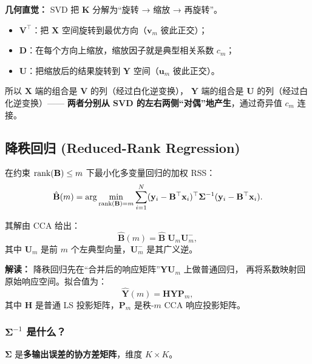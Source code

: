 \medskip
\noindent
\textbf{几何直觉：} SVD 把 $\mathbf{K}$ 分解为``旋转 → 缩放 → 再旋转''。
\begin{itemize}
    \item $\mathbf{V}^\top$：把 $\mathbf{X}$ 空间旋转到最优方向（$\mathbf{v}_m$ 彼此正交）；
    \item $\mathbf{D}$：在每个方向上缩放，缩放因子就是典型相关系数 $c_m$；
    \item $\mathbf{U}$：把缩放后的结果旋转到 $\mathbf{Y}$ 空间（$\mathbf{u}_m$ 彼此正交）。
\end{itemize}

所以 $\mathbf{X}$ 端的组合是 $\mathbf{V}$ 的列（经过白化逆变换），
$\mathbf{Y}$ 端的组合是 $\mathbf{U}$ 的列（经过白化逆变换）——
\textbf{两者分别从 SVD 的左右两侧``对偶''地产生}，通过奇异值 $c_m$ 连接。

\subsection{降秩回归 (Reduced-Rank Regression)}

\begin{definition}[降秩回归]
在约束 $\operatorname{rank}(\mathbf{B}) \le m$ 下最小化多变量回归的加权 RSS：
\begin{equation}\label{eq:rrr}
    \hat{\mathbf{B}}(m) = \arg\min_{\operatorname{rank}(\mathbf{B})=m}
    \sum_{i=1}^{N} (\mathbf{y}_i - \mathbf{B}^\top \mathbf{x}_i)^\top
    \bm{\Sigma}^{-1} (\mathbf{y}_i - \mathbf{B}^\top \mathbf{x}_i).
\end{equation}
\end{definition}

其解由 CCA 给出：
\[
    \hat{\mathbf{B}}(m) = \hat{\mathbf{B}} \; \mathbf{U}_m \mathbf{U}_m^{-},
\]
其中 $\mathbf{U}_m$ 是前 $m$ 个左典型向量，$\mathbf{U}_m^{-}$ 是其广义逆。

\textbf{解读：} 降秩回归先在``合并后的响应矩阵''$\mathbf{Y}\mathbf{U}_m$ 上做普通回归，
再将系数映射回原始响应空间。拟合值为：
\[
    \hat{\mathbf{Y}}(m) = \mathbf{H} \mathbf{Y} \mathbf{P}_m,
\]
其中 $\mathbf{H}$ 是普通 LS 投影矩阵，$\mathbf{P}_m$ 是秩-$m$ CCA 响应投影矩阵。

\medskip
\noindent


\subsubsection{$\bm{\Sigma}^{-1}$ 是什么？}

$\bm{\Sigma}$ 是\textbf{多输出误差的协方差矩阵}，维度 $K \times K$。

